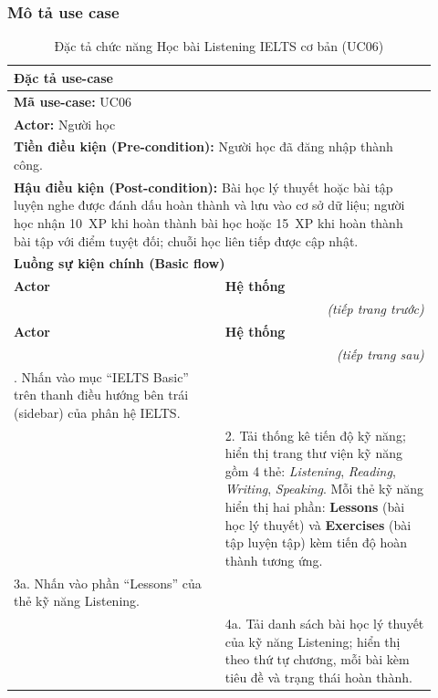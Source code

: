 \subsubsection{Mô tả use case}
\renewcommand{\arraystretch}{1.3}
\begin{longtable}{|p{0.46\linewidth}|p{0.46\linewidth}|}
    \caption{Đặc tả chức năng Học bài Listening IELTS cơ bản (UC06)} \label{tab:uc06_spec} \\
    \hline
    \multicolumn{2}{|l|}{\textbf{Đặc tả use-case}} \\ \hline
    \multicolumn{2}{|l|}{\textbf{Mã use-case:} UC06} \\ \hline
    \multicolumn{2}{|l|}{\textbf{Actor:} Người học} \\ \hline
    \multicolumn{2}{|p{0.88\linewidth}|}{\textbf{Tiền điều kiện (Pre-condition):} Người học đã đăng nhập thành công.} \\ \hline
    \multicolumn{2}{|p{0.88\linewidth}|}{\textbf{Hậu điều kiện (Post-condition):} Bài học lý thuyết hoặc bài tập luyện nghe được đánh dấu hoàn thành và lưu vào cơ sở dữ liệu; người học nhận 10~XP khi hoàn thành bài học hoặc 15~XP khi hoàn thành bài tập với điểm tuyệt đối; chuỗi học liên tiếp được cập nhật.} \\ \hline
    \multicolumn{2}{|l|}{\textbf{Luồng sự kiện chính (Basic flow)}} \\ \hline
    \textbf{Actor} & \textbf{Hệ thống} \\ \hline
    \endfirsthead
    \multicolumn{2}{r}{\textit{(tiếp trang trước)}} \\
    \hline
    \textbf{Actor} & \textbf{Hệ thống} \\ \hline
    \endhead
    \hline
    \multicolumn{2}{r}{\textit{(tiếp trang sau)}} \\
    \endfoot
    \hline
    \endlastfoot
    1. Nhấn vào mục ``IELTS Basic'' trên thanh điều hướng bên trái (sidebar) của phân hệ IELTS. & \\ \hline
    & 2. Tải thống kê tiến độ kỹ năng; hiển thị trang thư viện kỹ năng gồm 4 thẻ: \textit{Listening}, \textit{Reading}, \textit{Writing}, \textit{Speaking}. Mỗi thẻ kỹ năng hiển thị hai phần: \textbf{Lessons} (bài học lý thuyết) và \textbf{Exercises} (bài tập luyện tập) kèm tiến độ hoàn thành tương ứng. \\ \hline
    3a. Nhấn vào phần ``Lessons'' của thẻ kỹ năng Listening. & \\ \hline
    & 4a. Tải danh sách bài học lý thuyết của kỹ năng Listening; hiển thị theo thứ tự chương, mỗi bài kèm tiêu đề và trạng thái hoàn thành. \\ \hline

\end{longtable}
